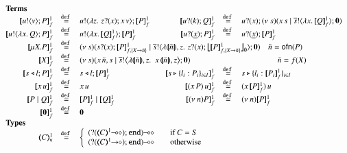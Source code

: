 \begin{figure}[h!]
\[
	\begin{array}{rclcrcl}
		\multicolumn{7}{l}{\textrm{\bf Terms}}
		\\
		\pmapp{\bout{u}{v} P}{1}{f}	&\defeq&	\bout{u}{ \abs{z}{\,\binp{z}{x} \appl{x}{v}} } \pmapp{P}{1}{f}
		& &
		\pmapp{\binp{u}{k} Q}{1}{f}	&\defeq&	\binp{u}{x} \newsp{s}{\appl{x}{s} \Par \bout{\dual{s}}{\abs{x}{\pmapp{Q}{1}{f}}} \inact}
		\\
		\pmapp{\bout{u}{\abs{x}{Q}} P}{1}{f} &\defeq& \bout{u}{\abs{x}{\pmapp{Q}{1}{f}}} \pmapp{P}{1}{f}
		& &
		\pmapp{\binp{u}{\underline{x}} P}{1}{f}	&\defeq&	\binp{u}{\underline{x}} \pmapp{P}{1}{f}
		\\
		\pmapp{\recp{X}{P}}{1}{f} &\defeq&
		\multicolumn{5}{l}{
			\newsp{s}{\binp{s}{x} \pmapp{P}{1}{{f,\{\varp{X}\to \tilde{n}\}}} \Par
			\bout{\dual{s}}{\abs{\vmap{\tilde{n}}, z } \,{\binp{z}{x} \auxmap{\pmapp{P}{1}{{f,\{\varp{X}\to \tilde{n}\}}}}{\es}}} \inact}
			\quad \tilde{n} = \ofn{P}
		}
		\\
		\pmapp{\varp{X}}{1}{f} &\defeq&
		\multicolumn{5}{l}{
			\newsp{s}{\appl{x}{\tilde{n}, s} \Par \bbout{\dual{s}}{ \abs{\vmap{\tilde{n}},z}\,\,{\appl{x}{ \vmap{\tilde{n}}, z}}} \inact}
			\qquad \qquad \qquad \qquad \qquad \quad \tilde{n} = f(\varp{X})
		}
		\\
		\pmapp{\bsel{s}{l} P}{1}{f}	&\defeq&	\bsel{s}{l} \pmapp{P}{1}{f}
		& & 
		\pmapp{\bbra{s}{l_i: P_i}_{i \in I}}{1}{f} &\defeq& \bbra{s}{l_i: \pmapp{P_i}{1}{f}}_{i \in I}
		\\
		\pmapp{\appl{x}{u}}{1}{f}	&\defeq&	\appl{x}{u}
		& &
		\pmapp{(\appl{\appl{x}{P})}{u}}{1}{f}	&\defeq&	\appl{(\appl{x}{\pmapp{P}{1}{f}})}{u}
		\\
		\pmapp{P \Par Q}{1}{f}		&\defeq&	\pmapp{P}{1}{f} \Par \pmapp{Q}{1}{f}
		& &
		\pmapp{\news{n} P}{1}{f}	&\defeq&	\news{n} \pmapp{P}{1}{f}
		\\
		\pmapp{\inact}{1}{f}		&\defeq&	\inact
		\\
		\multicolumn{7}{l}{\textrm{\bf Types}}
		\\
		\tmap{C}{1}_\mathsf{v}		&\defeq&
		\multicolumn{5}{l}{
			\left\{
			\begin{array}{rcl}
				\lhot{(\btinp{\lhot{\tmap{C}{1}}} \tinact)} && \textrm{if } C = S\\
				\lhot{(\btinp{\shot{\tmap{C}{1}}} \tinact)} && \textrm{otherwise}\\
			\end{array}
			\right.
		}
		\\

\end{array}\]
\end{figure}
